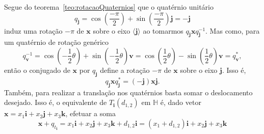 \documentclass[a4paper,12pt]{report}
\theoremstyle{plain}
\theoremstyle{definition}
\begin{document}
	Segue do teorema~\ref{teo:rotacaoQuaternios} que o quatérnio unitário $$q_{\mathbf j} = \cos(\frac{-\pi}{2}) + \sin(\frac{-\pi} 2 )\mathbf j =  -\mathbf j$$ induz uma rotação ${-\pi}$ de $\mathbf x$ sobre o eixo $\langle \mathbf j\rangle$ ao tomarmos $q_{\mathbf j}\mathbf xq_{\mathbf j}^{-1}$. Mas como, para um quatérnio de rotação genérico 
	\begin{equation}
		q_{\mathbf v}^{-1} = 
		\cos \left(- \textstyle\frac{1}{2} \theta \right) + 
		\sin \left(- \textstyle\frac{1}{2} \theta \right)\mathbf v =
		\cos \left( \textstyle\frac{1}{2} \theta \right) - 
		\sin \left( \textstyle\frac{1}{2} \theta \right)\mathbf v = 
		q_{\mathbf v}^{*},
		\label{eq:quaternion_otherangle}
	\end{equation}
	então o conjugado de $\mathbf x$ por $q_{\mathbf j}$ define a rotação ${-\pi}$ de $\mathbf x$ sobre o eixo $\mathbf j$.
	Isso é, $$q_{\mathbf j}\mathbf x q_{\mathbf j}^* = (-\mathbf j)\mathbf x\mathbf j.$$
	Também, para realizar a translação nos quatérnios basta somar o deslocamento desejado. Isso é, o equivalente de $T_{\mathbf i}(d_{1,2})$ em $\mathbb{H}$ é, dado vetor $\mathbf x = x_1\mathbf i + x_2 \mathbf j + x_3 \mathbf k$, efetuar a soma $$\mathbf x + q_{t_{\mathbf i}} = x_1\mathbf i + x_2 \mathbf j + x_3 \mathbf k + d_{1,2}\mathbf i = (x_1+d_{1,2})\mathbf i + x_2 \mathbf j + x_3 \mathbf k$$
	
\end{document}
